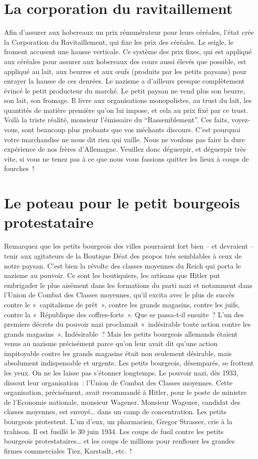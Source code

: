 \documentclass[french,twoside]{book} %
\begin{document}
\section[La corporation du ravitaillement]{La corporation du ravitaillement}
\noindent Afin d’assurer aux hobereaux un prix rémunérateur pour leurs céréales, l’état crée la Corporation du Ravitaillement, qui fixe les prix des céréales. Le seigle, le froment accusent une hausse verticale. Ce système des prix fixes, qui est appliqué aux céréales pour assurer aux hobereaux des cours aussi élevés que possible, est appliqué au lait, aux beurres et aux œufs (produits par les petits paysans) pour enrayer la hausse de ces denrées. Le nazisme a d’ailleurs presque complètement évincé le petit producteur du marché. Le petit paysan ne vend plus son beurre, son lait, son fromage. Il livre aux organisations monopolistes, au trust du lait, les quantités de matière première qu’on lui impose, et cela au prix fixé par ce trust. Voilà la triste réalité, monsieur l’émissaire du “Rassemblement”. Ces faits, voyez-vous, sont beaucoup plus probants que vos méchants discours. C’est pourquoi votre marchandise ne nous dit rien qui vaille. Nous ne voulons pas faire la dure expérience de nos frères d’Allemagne. Veuillez donc déguerpir, et déguerpir très vite, si vous ne tenez pas à ce que nous vous fassions quitter les lieux à coups de fourches !
\section[Le poteau pour le petit bourgeois protestataire]{Le poteau pour le petit bourgeois protestataire}
\noindent Remarquez que les petits bourgeois des villes pourraient fort bien – et devraient – tenir aux agitateurs de la Boutique Déat des propos très semblables à ceux de notre paysan. C’est bien la révolte des classes moyennes du Reich qui porta le nazisme au pouvoir. Ce sont les boutiquiers, les artisans que Hitler put embrigader le plus aisément dans les formations du parti nazi et notamment dans l’Union de Combat des Classes moyennes, qu’il excita avec le plus de succès contre le « capitalisme de prêt », contre les grands magasins, contre les juifs, contre la « République des coffres-forts ». Que se passa-t-il ensuite ? L’un des premiers décrets du pouvoir nazi proclamait « indésirable toute action contre les grands magasins ». Indésirable ? Mais les petits bourgeois allemands étaient venus au nazisme précisément parce qu’on leur avait dit qu’une action impitoyable contre les grands magasins était non seulement désirable, mais absolument indispensable et urgente. Les petits bourgeois, désemparés, se frottent les yeux. On ne les laisse pas s’étonner longtemps. Le pouvoir nazi, dès 1933, dissout leur organisation : l’Union de Combat des Classes moyennes. Cette organisation, précisément, avait recommandé à Hitler, pour le poste de ministre de l’Economie nationale, monsieur Wagener. Monsieur Wagener, candidat des classes moyennes, est envoyé… dans un camp de concentration. Les petits bourgeois protestent. L’un d’eux, un pharmacien, Gregor Strasser, crie à la trahison. Il est fusillé le 30 juin 1934. Les coups de fusil contre les petits bourgeois protestataires… et les coups de millions pour renflouer les grandes firmes commerciales Tiez, Karstadt, etc. !
\end{document}
